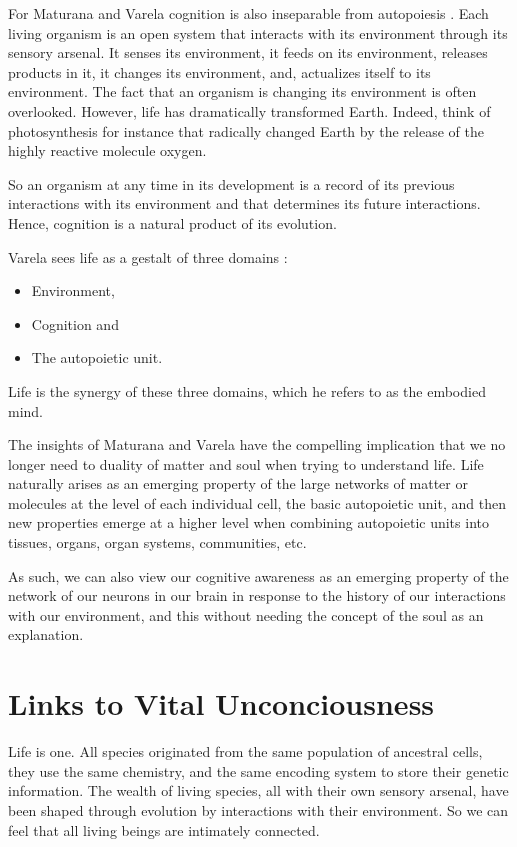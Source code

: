 \documentclass[
  11pt,
]{book}
\providecommand{\tightlist}{%
  \setlength{\itemsep}{0pt}\setlength{\parskip}{0pt}}
\begin{document}
For Maturana and Varela cognition is also inseparable from autopoiesis \citep{capraLuisi2014}. Each living organism is an open system that interacts with its environment through its sensory arsenal. It senses its environment, it feeds on its environment, releases products in it, it changes its environment, and, actualizes itself to its environment. The fact that an organism is changing its environment is often overlooked. However, life has dramatically transformed Earth. Indeed, think of photosynthesis for instance that radically changed Earth by the release of the highly reactive molecule oxygen.

So an organism at any time in its development is a record of its previous interactions with its environment and that determines its future interactions.
Hence, cognition is a natural product of its evolution.

Varela sees life as a gestalt of three domains \citep{capraLuisi2014}:

\begin{itemize}
\tightlist
\item
  Environment,
\item
  Cognition and
\item
  The autopoietic unit.
\end{itemize}

Life is the synergy of these three domains, which he refers to as the embodied mind.

The insights of Maturana and Varela have the compelling implication that we no longer need to duality of matter and soul when trying to understand life. Life naturally arises as an emerging property of the large networks of matter or molecules at the level of each individual cell, the basic autopoietic unit, and then new properties emerge at a higher level when combining autopoietic units into tissues, organs, organ systems, communities, etc.

As such, we can also view our cognitive awareness as an emerging property of the network of our neurons in our brain in response to the history of our interactions with our environment, and this without needing the concept of the soul as an explanation.

\hypertarget{links-to-vital-unconciousness}{%
\section{Links to Vital Unconciousness}\label{links-to-vital-unconciousness}}

Life is one. All species originated from the same population of ancestral cells, they use the same chemistry, and the same encoding system to store their genetic information.
The wealth of living species, all with their own sensory arsenal, have been shaped through evolution by interactions with their environment.
So we can feel that all living beings are intimately connected.
\end{document}
